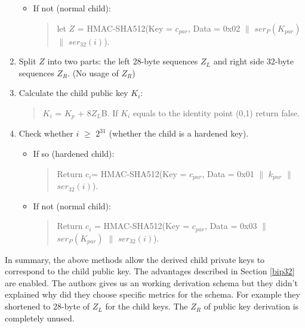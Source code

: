 \begin{adjustwidth}{0.5cm}{}
\begin{enumerate}
\begin{itemize}
\begin{quote}
                        \end{quote}

                  \item If not (normal child):
                        \begin{quote}
                            let $Z$ = HMAC-SHA512(Key = $c_{par}$, Data = 0x02 $\parallel$ $ser_P(K_{par})$ $\parallel$ $ser_{32}(i)$).

                        \end{quote}
              \end{itemize}
              \bigskip

        \item Split $Z$ into two parts: the left 28-byte sequences $Z_L$ and right side 32-byte sequences $Z_R$. (No usage of  $Z_R$)

              \bigskip
        \item Calculate the child public key $K_i$:
              \begin{quote}
                  $K_i$ = $K_p$ + 8$Z_L$B. If $K_i$ equals to the identity point (0,1) return false.
              \end{quote}

              \bigskip

        \item Check whether $i$ $\geq$ $2^{31}$ (whether the child is a hardened key).
              \begin{itemize}
                  \item If so (hardened child):
                        \begin{quote}
                            Return  $c_i$= HMAC-SHA512(Key = $c_{par}$, Data = 0x01 $\parallel$ $k_{par}$ $\parallel$ $ser_{32}(i)$).
                        \end{quote}
                  \item If not (normal child):
                        \begin{quote}
                            Return $c_i$ = HMAC-SHA512(Key = $c_{par}$, Data = 0x03 $\parallel$ $ser_P(K_{par})$ $\parallel$ $ser_{32}(i)$).
                        \end{quote}
              \end{itemize}
              \bigskip

    \end{enumerate}

    In summary, the above methods allow the derived child private keys to correspond to the child public key. The advantages described in Section \ref{bip32} are enabled.
    The authors gives us an working derivation schema but they didn't explained why did they choose specific metrics for the schema. For example they shortened to 28-byte of $Z_L$ for the child keys.
    The $Z_R$ of public key derivation is completely unused.

\end{adjustwidth}

